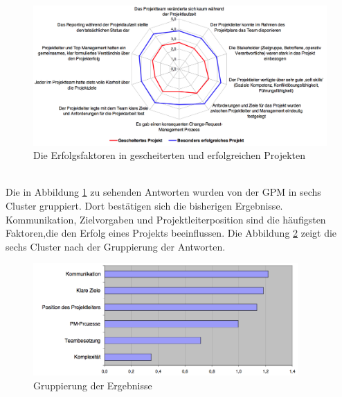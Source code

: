 \documentclass[12pt]{scrartcl}
\begin{document}
\begin{figure}[H]
	\begin{center}
		\includegraphics[width=1.1\textwidth]{img/ergebnis_erfolgsfaktoren}
		\caption{Die Erfolgsfaktoren in gescheiterten und erfolgreichen Projekten}
		\label{ergebnis_gpm_erfolgsfaktoren}	
	\end{center}
\end{figure}
\ \\
Die in Abbildung \ref{ergebnis_gpm_erfolgsfaktoren} zu sehenden Antworten wurden von der GPM in sechs Cluster gruppiert. Dort bestätigen sich die bisherigen Ergebnisse. Kommunikation, Zielvorgaben und Projektleiterposition sind die häufigsten Faktoren,die  den Erfolg eines Projekts beeinflussen. Die Abbildung \ref{ergebnis_gpm_gruppiert} zeigt die sechs Cluster nach der Gruppierung der Antworten. 

\begin{figure}[H]
	\begin{center}
		\includegraphics[width=0.9\textwidth]{img/ergebnis_gpm_gruppiert}
		\caption{Gruppierung der Ergebnisse}
		\label{ergebnis_gpm_gruppiert}	
	\end{center}
\end{figure}
\end{document}
